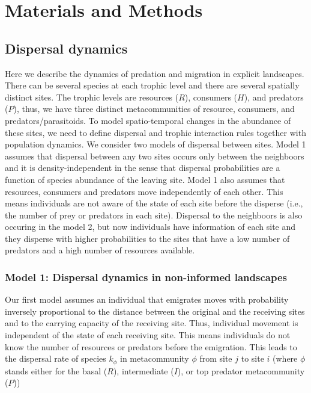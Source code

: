 \section{Materials and Methods}


\subsection{Dispersal dynamics}

Here we describe the dynamics of predation and migration in explicit
landscapes. There can be several species at each trophic level and
there are several spatially distinct sites. The trophic levels are
resources ($R$), consumers ($H$), and predators ($P$), thus, we have
three distinct metacommunities of resource, consumers, and
predators/parasitoids. To model spatio-temporal changes in the
abundance of these sites, we need to define dispersal and trophic
interaction rules together with population dynamics. We consider two
models of dispersal between sites. Model 1 assumes that dispersal
between any two sites occurs only between the neighboors and it is
density-independent in the sense that dispersal probabilities are a
function of species abundance of the leaving site. Model 1 also
assumes that resources, consumers and predators move independently of
each other. This means individuals are not aware of the state of each
site before the disperse (i.e., the number of prey or predators in
each site). Dispersal to the neighboors is also occuring in the model
2, but now individuals have information of each site and they disperse
with higher probabilities to the sites that have a low number of
predators and a high number of resources available.


\subsubsection{Model 1: Dispersal dynamics in non-informed landscapes}

Our first model assumes an individual that emigrates moves with
probability inversely proportional to the distance between the
original and the receiving sites and to the carrying capacity of the
receiving site. Thus, individual movement is independent of the state
of each receiving site. This means individuals do not know the number
of resources or predators before the emigration. This leads to the
dispersal rate of species $k_{\mathcal{\phi}}$ in metacommunity
$\mathcal{\phi}$ from site $j$ to site $i$ (where $\mathcal{\phi}$
stands either for the basal ($R$), intermediate ($I$), or top predator
metacommunity ($P$))

